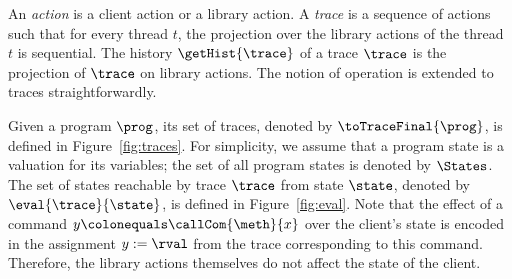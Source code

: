 An \emph{action} is a client action or a library action.
A \emph{trace} is a sequence of actions such that 
for every thread $t$, the projection over the library actions of the thread $t$ is sequential.
The history $\getHist{\trace}$ of a trace $\trace$ is the projection of $\trace$ on library actions.
The notion of operation is extended to traces straightforwardly. 

Given a program $\prog$, its set of traces, denoted by $\toTraceFinal{\prog}$, is defined in Figure~\ref{fig:traces}.
For simplicity, we assume that a program state is a valuation for its variables; the set of all program states is denoted by $\States$.
The set of states reachable by trace $\trace$ from state $\state$, denoted by $\eval{\trace}{\state}$, is defined in Figure~\ref{fig:eval}. 
Note that the effect of a command $y \colonequals \callCom{\meth}{x}$ over the client's state is encoded in the assignment $y:=\rval$
from the trace corresponding to this command. Therefore, the library actions themselves do not affect the state of the client.

